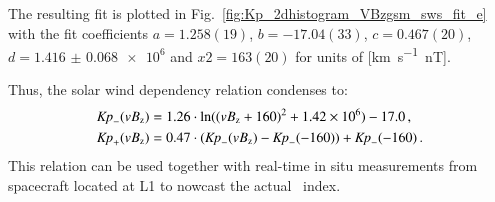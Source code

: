The resulting fit is plotted in Fig.~\ref{fig:Kp_2dhistogram_VBzgsm_sws_fit_e} with the fit coefficients $a = 1.258(19)$, $b = -17.04(33)$, $c = 0.467(20)$, $d = \num{1.416(68)e6}$ and $x2 = 163(20)$ for units of [\si{\km\per\s \nano\tesla}].\\
\begin{figure}
\end{figure}

Thus, the solar wind dependency relation condenses to:
\begin{align}
	\text{\textit{Kp}}_-(vB_\text{z}) &= 1.26 \cdot \ln((vB_\text{z} + 160)^2 + \num{1.42e6}) - 17.0	\,,	\label{eq:kpvsvbz_dependency_function_negative}\\
	\text{\textit{Kp}}_+(vB_\text{z}) &= 0.47 \cdot (\text{\textit{Kp}}_-(vB_\text{z}) - \text{\textit{Kp}}_-(-160)) + \text{\textit{Kp}}_-(-160)	\,.	\label{eq:kpvsvbz_dependency_function_positive}
\end{align}
This relation can be used together with real-time in situ measurements from spacecraft located at L1 to nowcast the actual \Kp~index.\\


